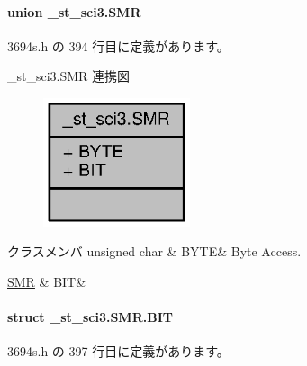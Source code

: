 \paragraph{union \+\_\+st\+\_\+sci3.\+S\+M\+R}


 3694s.\+h の 394 行目に定義があります。



\+\_\+st\+\_\+sci3.\+S\+M\+R 連携図
\nopagebreak
\begin{figure}[H]
\begin{center}
\leavevmode
\includegraphics[width=122pt]{d6/de4/union__st__sci3_8SMR__coll__graph}
\end{center}
\end{figure}
\begin{DoxyFields}{クラスメンバ}
unsigned char\label{3694s_8h_ae409eb2ba6eb6801f52763ae370c350e}
&
B\+Y\+T\+E&
Byte Access. \\
\hline

\hyperlink{3694s_8h_dd/db4/struct__st__sci3_8SMR_8BIT}{S\+M\+R}\label{3694s_8h_adb957fdc8000e1eef04a243f5199aa52}
&
B\+I\+T&
\\
\hline

\end{DoxyFields}
\label{struct__st__sci3_8SMR_8BIT}
\paragraph{struct \+\_\+st\+\_\+sci3.\+S\+M\+R.\+B\+I\+T}


 3694s.\+h の 397 行目に定義があります。



